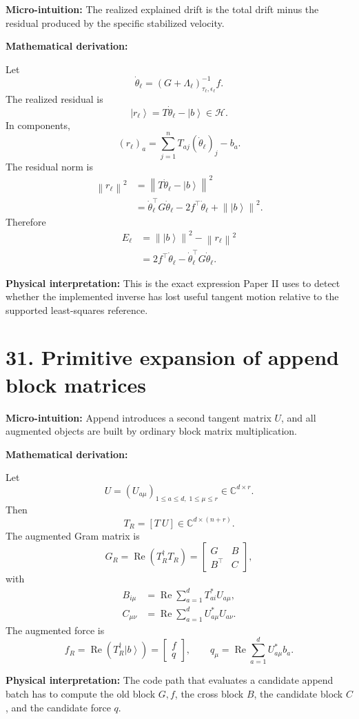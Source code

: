 \documentclass[10pt,twocolumn]{article}
\newcommand{\ket}[1]{\left|#1\right\rangle}
\newcommand{\norm}[1]{\left\lVert #1\right\rVert}
\newcommand{\C}{\mathbb C}
\newcommand{\Hh}{\mathcal H}
\newcommand{\Real}{\operatorname{Re}}
\newcommand{\micro}[1]{%
  \par\smallskip
  \noindent\textcolor{deepblue}{\textbf{Micro-intuition:}} #1
  \par\smallskip}
\newcommand{\deriv}{%
  \par\noindent\textcolor{deepviolet}{\textbf{Mathematical derivation:}}\par\vspace{-1mm}}
\newcommand{\phys}[1]{%
  \par\smallskip
  \noindent\textcolor{deepgreen}{\textbf{Physical interpretation:}} #1
  \par\smallskip}
\begin{document}
\micro{The realized explained drift is the total drift minus the residual
produced by the specific stabilized velocity.}

\deriv
Let
\[
\dot\theta_\ell=(G+\Lambda_\ell)_{\tau_\ell,\epsilon_\ell}^{-1}f.
\]
The realized residual is
\[
\ket{r_\ell}=T\dot\theta_\ell-\ket b\in\Hh.
\]
In components,
\[
(r_\ell)_a
=
\sum_{j=1}^{n}T_{aj}(\dot\theta_\ell)_j-b_a.
\]
The residual norm is
\[
\begin{aligned}
\norm{r_\ell}^2
&=
\norm{T\dot\theta_\ell-\ket b}^2\\
&=
\dot\theta_\ell^\top G\dot\theta_\ell
-2f^\top\dot\theta_\ell
+\norm{\ket b}^2.
\end{aligned}
\]
Therefore
\[
\begin{aligned}
E_\ell
&=\norm{\ket b}^2-\norm{r_\ell}^2\\
&=
2f^\top\dot\theta_\ell
-\dot\theta_\ell^\top G\dot\theta_\ell.
\end{aligned}
\]

\phys{This is the exact expression Paper II uses to detect whether the
implemented inverse has lost useful tangent motion relative to the supported
least-squares reference.}

\section*{31. Primitive expansion of append block matrices}

\micro{Append introduces a second tangent matrix \(U\), and all augmented
objects are built by ordinary block matrix multiplication.}

\deriv
Let
\[
U=(U_{a\mu})_{1\le a\le d,\;1\le \mu\le r}\in\C^{d\times r}.
\]
Then
\[
T_R=[T~U]\in\C^{d\times(n+r)}.
\]
The augmented Gram matrix is
\[
G_R=\Real(T_R^\dagger T_R)
=
\begin{bmatrix}
G&B\\
B^\top&C
\end{bmatrix},
\]
with
\[
\begin{aligned}
B_{i\mu}
&=\Real\sum_{a=1}^{d}T_{ai}^*U_{a\mu},\\
C_{\mu\nu}
&=\Real\sum_{a=1}^{d}U_{a\mu}^*U_{a\nu}.
\end{aligned}
\]
The augmented force is
\[
f_R=\Real(T_R^\dagger\ket b)
=
\begin{bmatrix}
f\\
q
\end{bmatrix},
\qquad
q_\mu=\Real\sum_{a=1}^{d}U_{a\mu}^*b_a.
\]

\phys{The code path that evaluates a candidate append batch has to compute the
old block \(G,f\), the cross block \(B\), the candidate block \(C\), and the
candidate force \(q\).}
\end{document}
